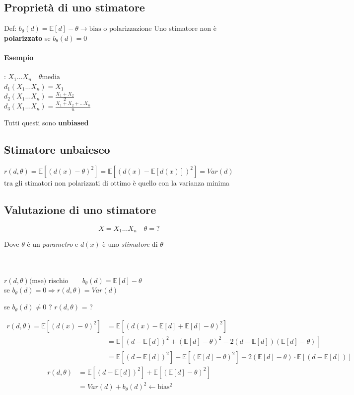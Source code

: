 \documentclass[]{article}
\newcommand{\ev}{\mathbb{E}[X]}
\renewcommand{\ev}[1]{\mathbb{E}[#1]}
\begin{document}
    \subsection{Proprietà di uno stimatore}
    Def: $b_\theta(d) = \ev{d} - \theta \rightarrow \text{bias o polarizzazione}$
    Uno stimatore non è \textbf{polarizzato} se $b_\theta(d) = 0$
    \paragraph{Esempio}:
    $X_1 \ldots X_n \quad \theta \text{media}$ \\
    $d_1(X_1 \ldots X_n) = X_1$ \\
    $d_2(X_1 \ldots X_n) = \frac{X_1 + X_2}{2}$ \\
    $d_3(X_1 \ldots X_n) = \frac{X_1 + X_2 + \ldots X_n}{n}$
    \centerline{Tutti questi sono \textbf{unbiased}}
    \subsection{Stimatore unbaieseo}
    $r(d, \theta) = \ev{(d(x) - \theta)^2} = \ev{(d(x) - \ev{d(x)})^2} = Var(d)$ \\
    tra gli stimatori non polarizzati di ottimo è quello con la varianza minima
    \subsection{Valutazione di uno stimatore}
    \[ X = X_1 \ldots X_n \quad \theta = ? \]
    \centerline{Dove $\theta$ è un \textit{parametro} e $d(x)$ è uno \textit{stimatore} di $\theta$} \\ \\
    $r(d, \theta) \text{(mse) rischio} \quad \quad b_\theta(d) = \ev{d} - \theta$ \\
    se $b_\theta(d) = 0 \Rightarrow r(d, \theta) = Var(d)$ \\
    \centerline{se $b_\theta(d) \not = 0$ ? $r(d, \theta)$ = ?}
    \begin{equation*}
        \begin{split}
            r(d, \theta) = \ev{(d(x) - \theta)^2} &= \ev{(d(x) - \ev{d} + \ev{d} - \theta)^2} \\
            &= \ev{(d - \ev{d})^2 + (\ev{d} - \theta)^2 - 2(d - \ev{d}) (\ev{d} - \theta)} \\
            &= \ev{(d - \ev{d})^2} + \ev{(\ev{d} - \theta)^2} - 2(\ev{d} - \theta) \cdot \ev{(d- \ev{d})}
        \end{split}
    \end{equation*}
    \begin{equation*}
        \begin{split}
           r(d, \theta) &= \ev{(d - \ev{d})^2} + \ev{(\ev{d} - \theta)^2} \\
           &= Var(d) + b_\theta(d)^2 \leftarrow \text{bias$^2$}
        \end{split}
    \end{equation*}
\end{document}
